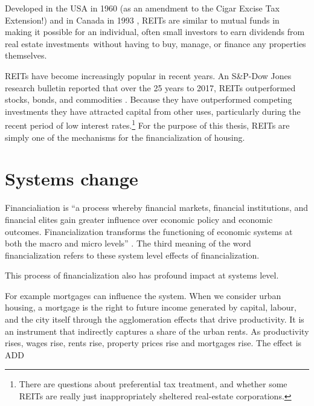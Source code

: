 Developed in the USA  in 1960 (as an amendment to the Cigar Excise Tax Extension!) and in Canada in 1993 \cite{GET_REITsDevelopedDates}, REITs are similar to mutual funds in making it possible for an individual, often small investors to earn dividends from real estate investments without having to buy, manage, or finance any properties themselves. 

REITs have become increasingly popular in recent years.  An S\&P-Dow Jones research bulletin reported that over the  25 years to 2017, REITs outperformed stocks, bonds, and commodities \cite{GET-Dow-Jones-research-bulletin}. %
Because they have outperformed competing investments they have attracted  capital from other uses, particularly during the recent period of low interest rates.\footnote{There are questions about preferential tax treatment, and whether some REITs are really just inappropriately sheltered real-estate corporations.} For the purpose of this thesis, REITs are simply one of the mechanisms for the financialization of housing.


\section{Systems change}
Financialiation is %
``a process whereby financial markets, financial institutions, and financial elites gain greater influence over economic policy and economic outcomes. Financialization transforms the functioning of economic systems at both the macro and micro levels'' \cite{palleyFinancializationWhatIt2007}. 
The third meaning of the word financialization refers to these system level effects of financialization. 

This process of financialization also has profound impact at systems level. 



For example mortgages can influence the system. When we consider urban housing, a mortgage is the right to future income generated by capital, labour, and the city itself through the agglomeration effects that drive productivity. It is an instrument that indirectly captures a share of the urban rents. As productivity rises, wages rise, rents rise, property prices rise and mortgages rise. The effect is ADD

